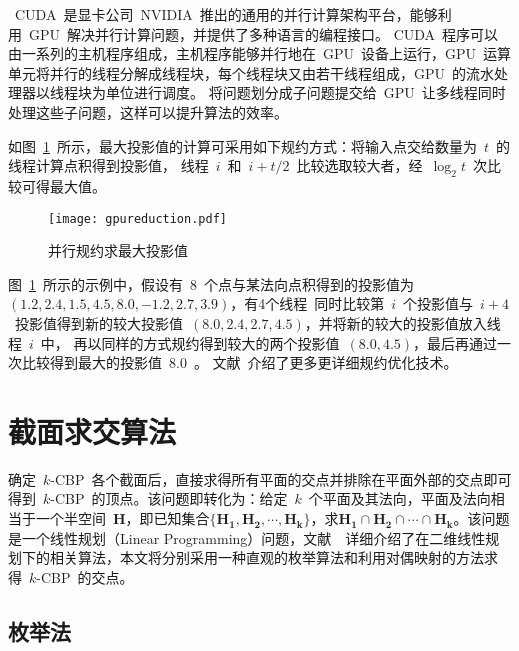 ~CUDA~是显卡公司~NVIDIA~推出的通用的并行计算架构平台，能够利用~GPU~解决并行计算问题，并提供了多种语言的编程接口。
CUDA~程序可以由一系列的主机程序组成，主机程序能够并行地在~GPU~设备上运行，GPU~运算单元将并行的线程分解成线程块，每个线程块又由若干线程组成，GPU~的流水处理器以线程块为单位进行调度。
将问题划分成子问题提交给~GPU~让多线程同时处理这些子问题，这样可以提升算法的效率\cite{lauterbach2009fast}。

如图~\ref{lbl:reduction-getmax}~所示，最大投影值的计算可采用如下规约方式：将输入点交给数量为~$t$~的线程计算点积得到投影值，
线程~$i$~和~$i+t/2$~比较选取较大者，经~$\log_2t$~次比较可得最大值。

\begin{figure}[htbp] %
\centering
\texttt{[image: gpureduction.pdf]}
\caption{并行规约求最大投影值}
\label{lbl:reduction-getmax}
\end{figure}

图~\ref{lbl:reduction-getmax}~所示的示例中，假设有~8~个点与某法向点积得到的投影值为~$(1.2,2.4,1.5,4.5,8.0,-1.2,2.7,3.9)$，有4个线程~同时比较第~$i$~个投影值与~$i+4$~投影值得到新的较大投影值~$(8.0,2.4,2.7,4.5)$，并将新的较大的投影值放入线程~$i$~中，
再以同样的方式规约得到较大的两个投影值~$(8.0,4.5)$，最后再通过一次比较得到最大的投影值~$8.0$~。
文献~介绍了更多更详细规约优化技术。

\section{截面求交算法}
\label{sec:intersect-planes}

确定~$k$-CBP~各个截面后，直接求得所有平面的交点并排除在平面外部的交点即可得到~$k$-CBP~的顶点。该问题即转化为：给定~$k$~个平面及其法向，平面及法向相当于一个半空间~$\bm{H}$，即已知集合$\{\bm{H_1},
\bm{H_2}, \cdots, \bm{H_k}\}$，求$\bm{H_1} \cap \bm{H_2} \cap \cdots
\cap \bm{H_k}$。该问题是一个线性规划（Linear Programming）问题，文献~~详细介绍了在二维线性规划下的相关算法，本文将分别采用一种直观的枚举算法和利用对偶映射的方法求得~$k$-CBP~的交点。

\subsection{枚举法}
\label{subsec:intersection-enum-geometry}

